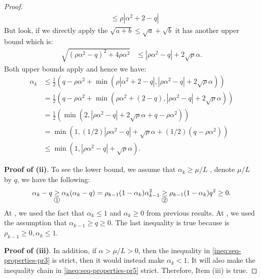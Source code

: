 \documentclass[12pt]{article}
\begin{document}
\begin{proof}
\begin{align*}
            &\le 
            \rho|\alpha^2 + 2 - q| 
        \end{align*}
        But look, if we directly apply the $\sqrt{a + b} \le \sqrt{a} + \sqrt{b}$ it has another upper bound which is: 
        \begin{align}\label{ineq:seq-properties-pr3}
            \sqrt{\left(\rho \alpha^2 - q\right)^2 + 4 \rho \alpha^2} 
            &\le 
            |\rho\alpha^2 - q| + 2\sqrt{\rho}\alpha. 
        \end{align}
        Both upper bounds apply and hence we have: 
        \begin{align*}
            \alpha_k 
            &\le
            \frac{1}{2}\left(
                q - \rho\alpha^2 + \min\left(
                    \rho|\alpha^2 + 2 - q|  , 
                    |\rho\alpha^2 - q| + 2\sqrt{\rho}\alpha
                \right)
            \right)
            \\
            &= 
            \frac{1}{2}\left(
                q - \rho\alpha^2 + \min\left(
                    \rho\alpha^2 + (2 - q)  , 
                    |\rho\alpha^2 - q| + 2\sqrt{\rho}\alpha
                \right)
            \right)
            \\
            &= 
            \frac{1}{2}\left(
                \min\left(
                    2, 
                    |\rho\alpha^2 - q| + 2\sqrt{\rho}\alpha + q - \rho\alpha^2
                \right)
            \right)
            \\
            &= 
            \min\left(
                    1, 
                    (1/2)|\rho\alpha^2 - q| + \sqrt{\rho}\alpha + (1/2)(q - \rho\alpha^2)
                \right)
            \\
            &\le \min\left(
                1, 
                |\rho\alpha^2 - q| + \sqrt{\rho}\alpha
            \right). 
        \end{align*}
        \par
        \textbf{Proof of (ii)}. 
        To see the lower bound, we assume that $\alpha_k \ge \mu/L$ , denote $\mu/L$ by $q$, we have the following: 
        \begin{align}\label{ineq:seq-properties-pr5}
            \alpha_k - q 
            \underset{\circled{1}}{\ge} \alpha_k(\alpha_k - q) 
            = \rho_{k - 1}(1 - \alpha_k)\alpha_{k - 1}^2
            \underset{\circled{2}}{\ge} \rho_{k - 1}(1 - \alpha_k)q^2 \ge 0. 
        \end{align}
        At , we used the fact that $\alpha_k \le 1$ and $\alpha_k \ge 0$ from previous results. 
        At , we used the assumption that $\alpha_{k - 1} \ge q \ge 0$. 
        The last inequality is true because is $\rho_{k - 1} \ge 0, \alpha_k \le 1$. 
        \par
        \textbf{Proof of (iii)}. 
        In addition, if $\alpha > \mu/L >  0$, then the inequality in \eqref{ineq:seq-properties-pr3} is strict, then it would instead make $\alpha_k < 1$. 
        It will also make the inequality chain in \eqref{ineq:seq-properties-pr5} strict. 
        Therefore, Item (iii) is true. 
    \end{proof}
\end{document}
